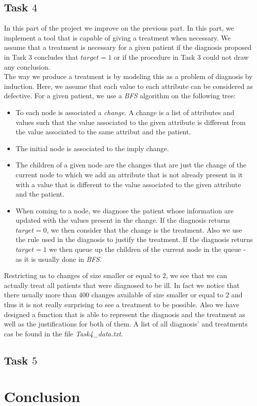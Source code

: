 \documentclass[french]{article}
\begin{document}
\subsection{Task $4$}
	In this part of the project we improve on the previous part. In this part, we implement a tool that is capable of giving a treatment when necessary. We assume that a treatment is necessary for a given patient if the diagnosis proposed in Task $3$ concludes that $target=1$ or if the procedure in Task $3$ could not draw any conclusion.\\
	The way we produce a treatment is by modeling this as a problem of diagnosis by induction. Here, we assume that each value to each attribute can be considered as defective. For a given patient, we use a \emph{BFS} algorithm on the following tree:
	\begin{itemize}
		\item To each node is associated a \emph{change}. A change is a list of attributes and values such that the value associated to the given attribute is different from the value associated to the same attribut and the patient.
		\item The initial node is associated to the imply change.
		\item The children of a given node are the changes that are just the change of the current node to which we add an attribute that is not already present in it with a value that is different to the value associated to the given attribute and the patient.
		\item When coming to a node, we diagnose the patient whose information are updated with the values present in the change. If the diagnosis returns $target=0$, we then consider that the change is the treatment. Also we use the rule used in the diagnosis to justify the treatment. If the diagnosis returns $target=1$ we then queue up the children of the current node in the queue - as it is usually done in \emph{BFS}.
	\end{itemize}
Restricting us to changes of size smaller or equal to $2$, we see that we can actually treat all patients that were diagnosed to be ill. In fact we notice that there usually more than $400$ changes available of size smaller or equal to $2$ and thus it is not really surprising to see a treatment to be possible. Also we have designed a function that is able to represent the diagnosis and the treatment as well as the justifications for both of them. A list of all diagnosis' and treatments cas be found in the file \emph{Task4\_data.txt}.

\subsection{Task $5$}

\section{Conclusion}
\end{document}
